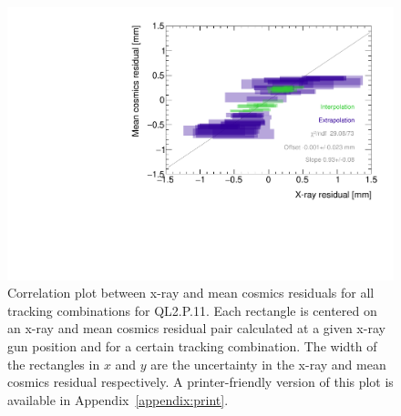\begin{figure}
    \centering
    \includegraphics[width = \textwidth]{figures/figure_QL2P11_3100V_2021-08-05_QL2P11_local_cosmic_and_xray_data_correlation_plot.pdf}
    \caption{Correlation plot between x-ray and mean cosmics residuals for all tracking combinations for QL2.P.11. Each rectangle is centered on an x-ray and mean cosmics residual pair calculated at a given x-ray gun position and for a certain tracking combination. The width of the rectangles in $x$ and $y$ are the uncertainty in the x-ray and mean cosmics residual respectively. A printer-friendly version of this plot is available in Appendix~\ref{appendix:print}.}
    \label{fig:correlation}
\end{figure}

